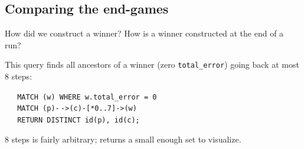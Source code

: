 \documentclass{beamer}
\newcommand{\linespace}{\vskip 0.25cm}
\begin{document}
\subsection{Comparing the end-games}

\begin{frame}{How did we construct a winner?}
	How is a winner constructed at the end of a run?
	
	\linespace
	
	This query finds all ancestors of a winner (zero \texttt{total\_error}) going back at most 8 steps:
	
	\linespace
	
	\texttt{$\quad$ MATCH (w) WHERE w.total\_error = 0 \\ %
		$\quad$ MATCH (p)-$\,$->(c)-[*0..7]->(w) \\
$\quad$ RETURN DISTINCT id(p), id(c);}

	\linespace
	
	8 steps is fairly arbitrary; returns a small enough set to visualize.
\end{frame}
\end{document}
